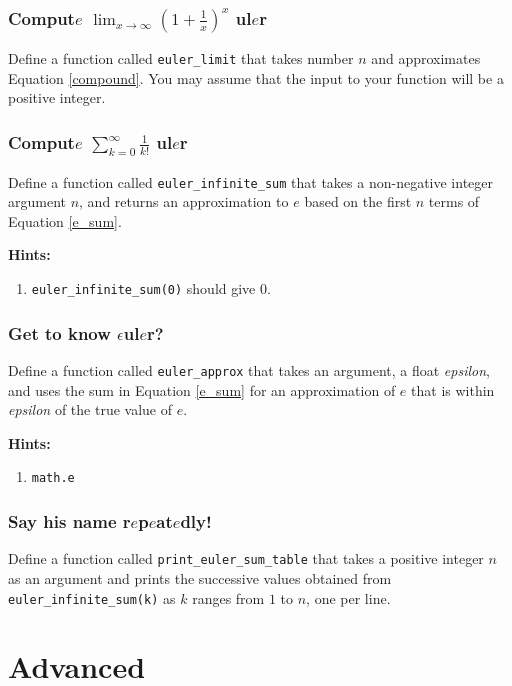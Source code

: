 \documentclass[a4paper]{article}
\begin{document}
\subsubsection{Comput$e$ $\lim_{x \to \infty} (1 + \frac{1}{x})^x$ ul$e$r}
Define a function called \texttt{euler\_limit} that takes number $n$ and approximates Equation \ref{compound}. You may assume that the input to your function will be a positive integer.

\subsubsection{Comput$e$ $\sum_{k=0}^{\infty}\frac{1}{k!}$ ul$e$r}
Define a function called \texttt{euler\_infinite\_sum} that takes a non-negative integer argument $n$, and returns an approximation to $e$ based on the first $n$ terms of Equation \ref{e_sum}.

\textbf{Hints:}
\begin{enumerate}
    \item \texttt{euler\_infinite\_sum(0)} should give $0$.
\end{enumerate}

\subsubsection{Get to know $\epsilon$ul$e$r?}
Define a function called \texttt{euler\_approx} that takes an argument, a float \textit{epsilon}, and uses the sum in Equation \ref{e_sum} for an approximation of $e$ that is within \textit{epsilon} of the true value of $e$. 

\textbf{Hints:}
\begin{enumerate}
    \item \texttt{math.e}
\end{enumerate}

\subsubsection{Say his name r$e$p$e$at$e$dly!}
Define a function called \texttt{print\_euler\_sum\_table} that takes a positive integer $n$ as an argument and prints the successive values obtained from \texttt{euler\_infinite\_sum(k)} as $k$ ranges from $1$ to $n$, one per line.


\newpage
\section{Advanced}
\end{document}
